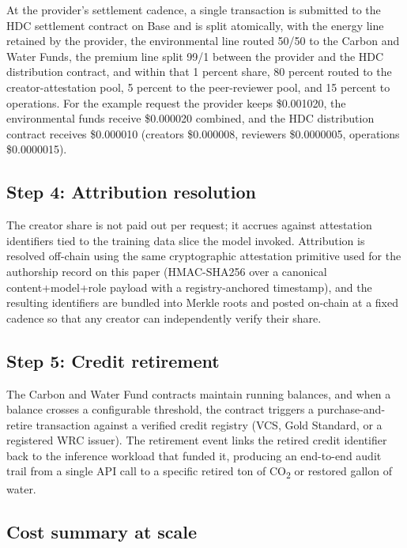 \documentclass[10pt,a4paper,twocolumn]{article}
\begin{document}
At the provider's settlement cadence, a single transaction is submitted to the HDC settlement contract on Base and is split atomically, with the energy line retained by the provider, the environmental line routed 50/50 to the Carbon and Water Funds, the premium line split 99/1 between the provider and the HDC distribution contract, and within that 1 percent share, 80 percent routed to the creator-attestation pool, 5 percent to the peer-reviewer pool, and 15 percent to operations. For the example request the provider keeps \$0.001020, the environmental funds receive \$0.000020 combined, and the HDC distribution contract receives \$0.000010 (creators \$0.000008, reviewers \$0.0000005, operations \$0.0000015).

\subsection*{Step 4: Attribution resolution}

The creator share is not paid out per request; it accrues against attestation identifiers tied to the training data slice the model invoked. Attribution is resolved off-chain using the same cryptographic attestation primitive used for the authorship record on this paper (HMAC-SHA256 over a canonical content+model+role payload with a registry-anchored timestamp), and the resulting identifiers are bundled into Merkle roots and posted on-chain at a fixed cadence so that any creator can independently verify their share.

\subsection*{Step 5: Credit retirement}

The Carbon and Water Fund contracts maintain running balances, and when a balance crosses a configurable threshold, the contract triggers a purchase-and-retire transaction against a verified credit registry (VCS, Gold Standard, or a registered WRC issuer). The retirement event links the retired credit identifier back to the inference workload that funded it, producing an end-to-end audit trail from a single API call to a specific retired ton of CO\textsubscript{2} or restored gallon of water.

\subsection*{Cost summary at scale}
\label{sec:cost-summary}
\end{document}
